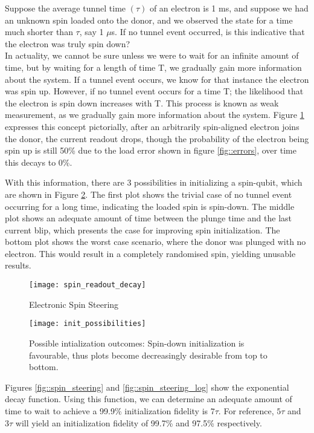 Suppose the average tunnel time $(\tau)$ of an electron is 1 ms, and suppose we had an unknown spin loaded onto the donor, and we observed the state for a time much shorter than $\tau$, say 1 $\mu$s. If no tunnel event occurred, is this indicative that the electron was truly spin down? \\
In actuality, we cannot be sure unless we were to wait for an infinite amount of time, but by waiting for a length of time T, we gradually gain more information about the system. If a tunnel event occurs, we know for that instance the electron was spin up. However, if no tunnel event occurs for a time T; the likelihood that the electron is spin down increases with T. This process is known as weak measurement, as we gradually gain more information about the system. Figure \ref{fig::spin_readout_decay} expresses this concept pictorially, after an arbitrarily spin-aligned electron joins the donor, the current readout drops, though the probability of the electron being spin up is still 50\% due to the load error shown in figure \ref{fig::errors}, over time this decays to 0\%. 

With this information, there are 3 possibilities in initializing a spin-qubit, which are shown in Figure \ref{fig::init_possibilities}. The first plot shows the trivial case of no tunnel event occurring for a long time, indicating the loaded spin is spin-down. The middle plot shows an adequate amount of time between the plunge time and the last current blip, which presents the case for improving spin initialization. The bottom plot shows the worst case scenario, where the donor was plunged with no electron. This would result in a completely randomised spin, yielding unusable results. 

\begin{figure}[htbp!]
	\centering
	\texttt{[image: spin\_readout\_decay]}
	\caption{Electronic Spin Steering}
	\label{fig::spin_readout_decay}
\end{figure}

\begin{figure}[htbp!]
	\centering
	\texttt{[image: init\_possibilities]}
	\caption[Possible initialisation outcomes]{Possible intialization outcomes: Spin-down initialization is favourable, thus plots become decreasingly desirable from top to bottom.}
	\label{fig::init_possibilities}
\end{figure}

Figures \ref{fig::spin_steering} and \ref{fig::spin_steering_log} show the exponential decay function. Using this function, we can determine an adequate amount of time to wait to achieve a 99.9\% initialization fidelity is $7 \tau$. For reference, $5 \tau$ and $3 \tau$ will yield an initialization fidelity of 99.7\% and 97.5\% respectively.

